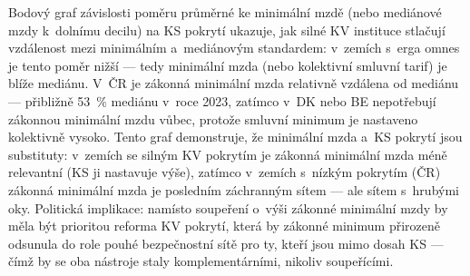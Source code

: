Bodový graf závislosti poměru průměrné ke minimální mzdě (nebo mediánové mzdy k~dolnímu decilu) na \ac{KS} pokrytí ukazuje, jak silné \ac{KV} instituce stlačují vzdálenost mezi minimálním a~mediánovým standardem: v~zemích s~erga omnes je tento poměr nižší --- tedy minimální mzda (nebo kolektivní smluvní tarif) je blíže mediánu.
V~ČR je zákonná minimální mzda relativně vzdálena od mediánu --- přibližně \SI{53}{\percent} mediánu v~roce 2023, zatímco v~DK nebo BE nepotřebují zákonnou minimální mzdu vůbec, protože smluvní minimum je nastaveno kolektivně vysoko.
Tento graf demonstruje, že minimální mzda a~\ac{KS} pokrytí jsou substituty: v~zemích se silným \ac{KV} pokrytím je zákonná minimální mzda méně relevantní (\ac{KS} ji nastavuje výše), zatímco v~zemích s~nízkým pokrytím (ČR) zákonná minimální mzda je posledním záchranným sítem --- ale sítem s~hrubými oky.
Politická implikace: namísto soupeření o~výši zákonné minimální mzdy by měla být prioritou reforma \ac{KV} pokrytí, která by zákonné minimum přirozeně odsunula do role pouhé bezpečnostní sítě pro ty, kteří jsou mimo dosah \ac{KS} --- čímž by se oba nástroje staly komplementárními, nikoliv soupeřícími.



